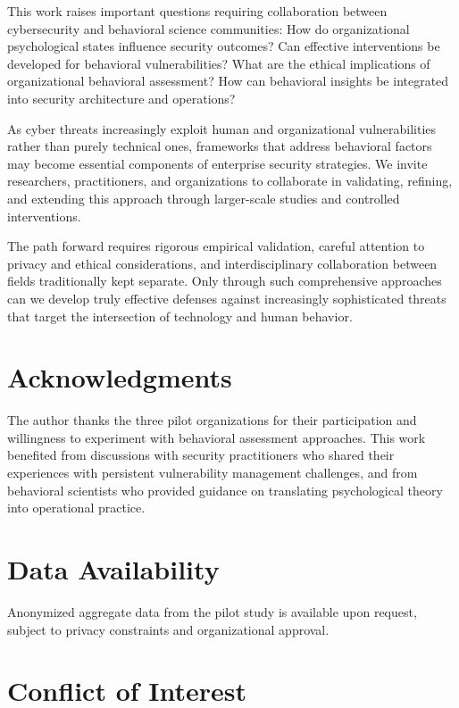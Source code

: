 \documentclass[10pt, twocolumn]{article}
\begin{document}
This work raises important questions requiring collaboration between cybersecurity and behavioral science communities: How do organizational psychological states influence security outcomes? Can effective interventions be developed for behavioral vulnerabilities? What are the ethical implications of organizational behavioral assessment? How can behavioral insights be integrated into security architecture and operations?

As cyber threats increasingly exploit human and organizational vulnerabilities rather than purely technical ones, frameworks that address behavioral factors may become essential components of enterprise security strategies. We invite researchers, practitioners, and organizations to collaborate in validating, refining, and extending this approach through larger-scale studies and controlled interventions.

The path forward requires rigorous empirical validation, careful attention to privacy and ethical considerations, and interdisciplinary collaboration between fields traditionally kept separate. Only through such comprehensive approaches can we develop truly effective defenses against increasingly sophisticated threats that target the intersection of technology and human behavior.

\section*{Acknowledgments}

The author thanks the three pilot organizations for their participation and willingness to experiment with behavioral assessment approaches. This work benefited from discussions with security practitioners who shared their experiences with persistent vulnerability management challenges, and from behavioral scientists who provided guidance on translating psychological theory into operational practice.

\section*{Data Availability}

Anonymized aggregate data from the pilot study is available upon request, subject to privacy constraints and organizational approval.

\section*{Conflict of Interest}
\end{document}
